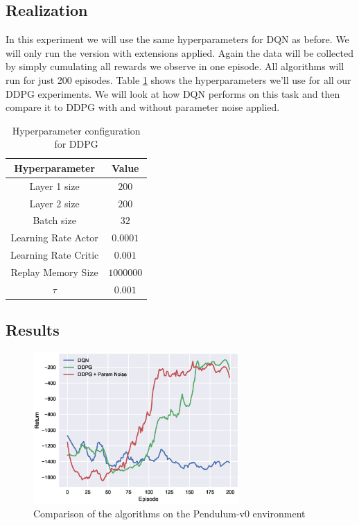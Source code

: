 \subsection{Realization}

In this experiment we will use the same hyperparameters for DQN as before.
We will only run the version with extensions applied.
Again the data will be collected by simply cumulating all rewards we observe in one episode.
All algorithms will run for just 200 episodes.
Table \ref{tb:ddpg_params} shows the hyperparameters we'll use for all our DDPG experiments.
We will look at how DQN performs on this task and then compare it to DDPG with and without parameter noise applied.

\begin{table}[H]
  \centering
  \begin{tabular}{| c | c |}
      \hline
      Hyperparameter & Value\\ \hline
      Layer 1 size & $200$\\
      Layer 2 size & $200$\\
      Batch size & $32$\\
      Learning Rate Actor & $0.0001$\\
      Learning Rate Critic & $0.001$\\
      Replay Memory Size & $1000000$\\
      $\tau$ & $0.001$\\
      \hline
  \end{tabular}
\caption{Hyperparameter configuration for DDPG}
\label{tb:ddpg_params}
\end{table}

\subsection{Results}

\begin{figure}[H]
\centerline{
\includegraphics[width=0.7\textwidth]{images/pendulum_compare.eps}}
\caption{Comparison of the algorithms on the Pendulum-v0 environment}
\label{fig:pendulum_compare}
\end{figure}

